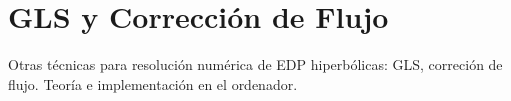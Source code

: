 
\section{GLS y Corrección de Flujo}

\begin{contenidos}
  Otras técnicas para resolución numérica de EDP hiperbólicas: GLS,
  correción de flujo. Teoría e implementación en el ordenador.
\end{contenidos}



